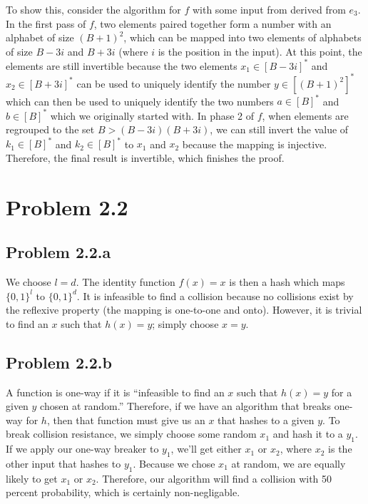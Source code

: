 \documentclass[psamsfonts]{amsart}
\begin{document}
To show this, consider the algorithm for $f$ with some input from derived from $e_3$. In the first pass of $f$, two elements paired together form a number with an alphabet of size $(B+1)^2$, which can be mapped into two elements of alphabets of size $B-3i$ and $B+3i$ (where $i$ is the position in the input). At this point, the elements are still invertible because the two elements $x_1 \in [B-3i]^*$ and $x_2 \in [B+3i]^*$ can be used to uniquely identify the number $y \in [(B+1)^2]^*$ which can then be used to uniquely identify the two numbers $a \in [B]^*$ and $b \in [B]^*$ which we originally started with. In phase 2 of $f$, when elements are regrouped to the set $B > (B - 3i) (B + 3i)$, we can still invert the value of $k_1 \in [B]^*$ and $k_2 \in [B]^*$ to $x_1$ and $x_2$ because the mapping is injective. Therefore, the final result is invertible, which finishes the proof.

\section{Problem 2.2}

\subsection{Problem 2.2.a}

We choose $l = d$. The identity function $f(x) = x$ is then a hash which maps $\{0, 1\}^l$ to $\{0, 1\}^d$. It is infeasible to find a collision because no collisions exist by the reflexive property (the mapping is one-to-one and onto). However, it is trivial to find an $x$ such that $h(x) = y$; simply choose $x = y$.

\subsection{Problem 2.2.b}

 A function is one-way if it is ``infeasible to find an $x$ such that $h(x) = y$ for a given $y$ chosen at random.'' Therefore, if we have an algorithm that breaks one-way for $h$, then that function must give us an $x$ that hashes to a given $y$. To break collision resistance, we simply choose some random $x_1$ and hash it to a $y_1$. If we apply our one-way breaker to $y_1$, we'll get either $x_1$ or $x_2$, where $x_2$ is the other input that hashes to $y_1$. Because we chose $x_1$ at random, we are equally likely to get $x_1$ or $x_2$. Therefore, our algorithm will find a collision with 50 percent probability, which is certainly non-negligable.
\end{document}
